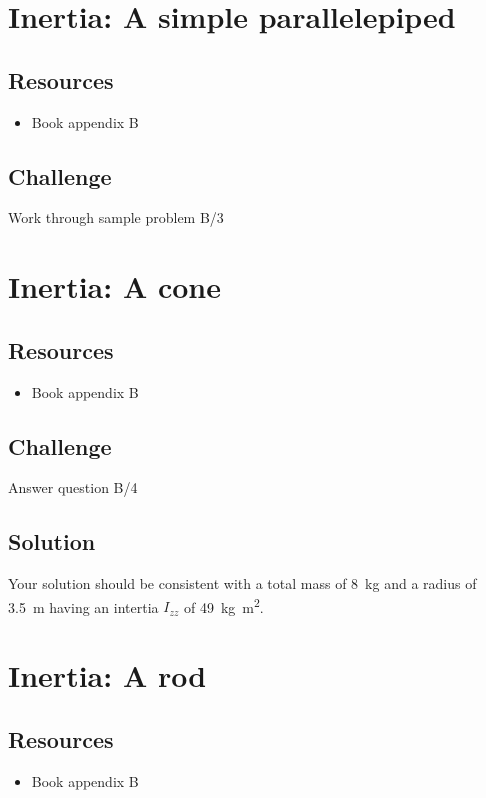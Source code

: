 \newpage
\section{Inertia: A simple parallelepiped}

\subsection*{Resources}
\begin{itemize}
    \item Book appendix B
\end{itemize}

\subsection*{Challenge}
Work through sample problem B/3




\newpage
\section{Inertia: A cone}

\subsection*{Resources}
\begin{itemize}
    \item Book appendix B
\end{itemize}

\subsection*{Challenge}
Answer question B/4

\subsection*{Solution}
Your solution should be consistent with a total mass of \SI{8}{\kg} and a radius of \SI{3.5}{\meter} having an intertia $I_{zz}$ of \SI{49}{\kg\meter^2}.




\newpage
\section{Inertia: A rod}

\subsection*{Resources}
\begin{itemize}
    \item Book appendix B
\end{itemize}


